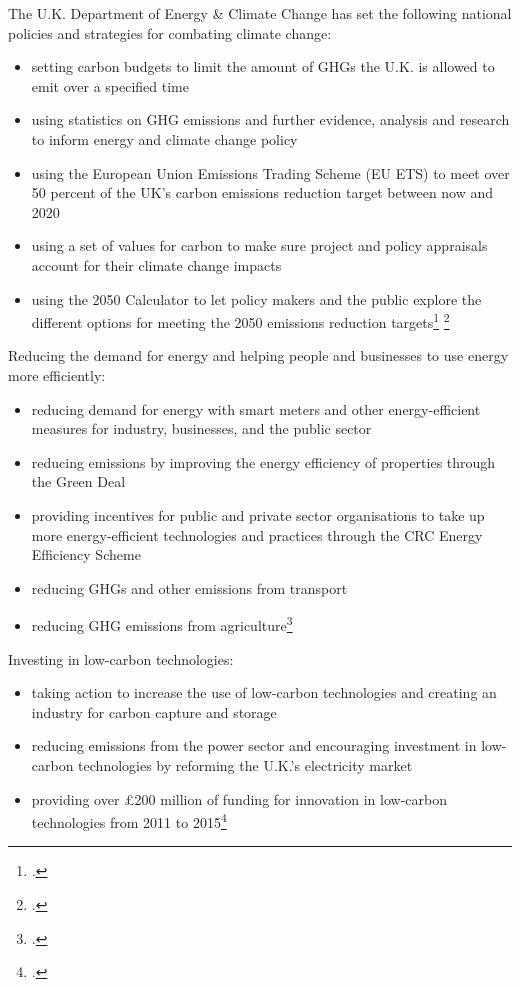 \documentclass[10pt]{article}
\begin{document}
The U.K. Department of Energy \& Climate Change has set the following national policies and strategies for combating climate change:
\begin{itemize}
	\item setting carbon budgets to limit the amount of GHGs the U.K. is allowed to emit over a specified time
	\item using statistics on GHG emissions and further evidence, analysis and research to inform energy and climate change policy
	\item using the European Union Emissions Trading Scheme (EU ETS) to meet over 50 percent of the UK's carbon emissions reduction target between now and 2020
	\item using a set of values for carbon to make sure project and policy appraisals account for their climate change impacts
	\item using the 2050 Calculator to let policy makers and the public explore the different options for meeting the 2050 emissions reduction targets\footcite[][]{UKgovnt} \footcite[][]{EUETS}
\end{itemize}



Reducing the demand for energy and helping people and businesses to use energy more efficiently:
\begin{itemize}
	\item reducing demand for energy with smart meters and other energy-efficient measures for industry, businesses, and the public sector
	\item reducing emissions by improving the energy efficiency of properties through the Green Deal
	\item providing incentives for public and private sector organisations to take up more energy-efficient technologies and practices through the CRC Energy Efficiency Scheme 
	\item reducing GHGs and other emissions from transport
	\item reducing GHG emissions from agriculture\footcite[][]{UKgovnt}
\end{itemize}



Investing in low-carbon technologies:
\begin{itemize}
	\item taking action to increase the use of low-carbon technologies and creating an industry for carbon capture and storage
	\item reducing emissions from the power sector and encouraging investment in low-carbon technologies by reforming the U.K.'s electricity market
	\item providing over £200 million of funding for innovation in low-carbon technologies from 2011 to 2015\footcite[][]{UKgovnt}
\end{itemize}
\end{document}
